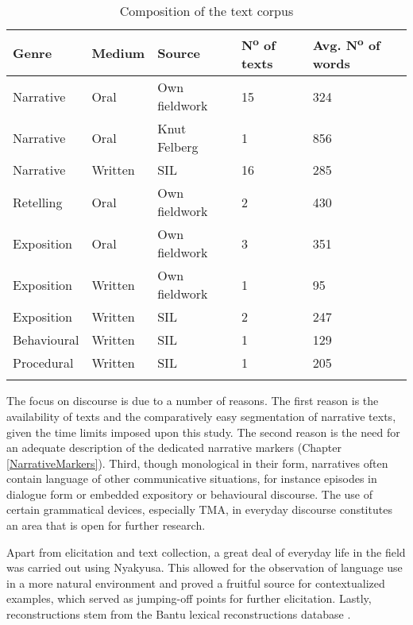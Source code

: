 \begin{table}[ht]
\begin{center}
\begin{tabular}{lllll}

\lsptoprule

\footnotesize{Genre} & \footnotesize{Medium} & \footnotesize{Source} & \footnotesize{N\textsuperscript{o}\xspace of texts} & \footnotesize{Avg. N\textsuperscript{o}\xspace of words}\\
\midrule

Narrative & Oral & Own fieldwork & 15 & 324\\
Narrative & Oral & Knut Felberg & 1 & 856\\
Narrative & Written & SIL & 16 & 285\\
Retelling & Oral & Own fieldwork & 2 & 430\\
Exposition & Oral & Own fieldwork & 3 & 351\\
Exposition & Written & Own fieldwork & 1 & 95\\
Exposition & Written & SIL & 2 & 247\\
Behavioural & Written & SIL & 1 & 129\\
Procedural & Written & SIL & 1 & 205\\
\lspbottomrule
\end{tabular}
\caption{Composition of the text corpus}
\label{CompositionTextCorpus}
\end{center}
\end{table}
\largerpage[1]
The focus on  discourse is due to a number of reasons. The first reason is the availability of texts and the comparatively easy segmentation of narrative texts, given the time limits imposed upon this study. The second reason is the need for an adequate description of the dedicated narrative markers (Chapter \ref{NarrativeMarkers}). Third, though monological in their form, narratives often contain language of other communicative situations, for instance episodes in dialogue form or embedded expository or behavioural discourse. The use of certain grammatical devices, especially TMA, in everyday discourse constitutes an area that is open for further research.

Apart from elicitation and text collection, a great deal of everyday life in the field was carried out using Nyakyusa. This allowed for the observation of language use in a more natural environment and proved a fruitful source for contextualized examples, which served as jumping-off points for further elicitation. Lastly,  reconstructions stem from the Bantu lexical reconstructions database \citep{BLR3}.

